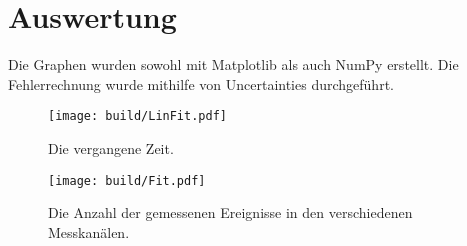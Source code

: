 \section{Auswertung}
\label{sec:Auswertung}


Die Graphen wurden sowohl mit Matplotlib \cite{matplotlib} als auch NumPy \cite{numpy} erstellt. Die
Fehlerrechnung wurde mithilfe von Uncertainties \cite{uncertainties} durchgeführt.



\begin{figure}
	\centering
	\texttt{[image: build/LinFit.pdf]}
	\caption{Die vergangene Zeit.}
	\label{fig:erste}
\end{figure}
\begin{figure}
	\centering
	\texttt{[image: build/Fit.pdf]}
	\caption{Die Anzahl der gemessenen Ereignisse in den verschiedenen Messkanälen.}
	\label{fig:erste}
\end{figure}

